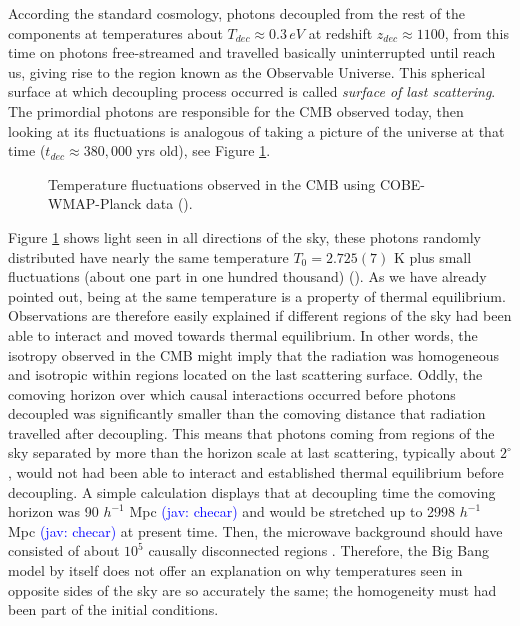\documentclass{rmaa}
\newcommand{\jav}[1]{\textcolor{blue}{(jav: #1)}}
\begin{document}
According the standard cosmology, photons decoupled from the rest of the 
components at temperatures about $T_{dec}\approx 0.3\, eV$ at redshift
$z_{dec} \approx 1100$, from this time on photons free-streamed and travelled basically
 uninterrupted until reach us, giving rise to the region known as the Observable Universe.
 This spherical surface at which decoupling process occurred is called 
\textit{surface of last scattering}.
The primordial photons are responsible for the CMB observed today, then looking at its
fluctuations is analogous of taking a picture of the universe at that time 
($t_{dec}\approx 380,000$ yrs old), see Figure \ref{fig:wmap5}.
\\

\begin{figure}[ht] 
\centerline{ \epsfxsize=210pt  }
\caption{Temperature fluctuations observed in the CMB using 
 COBE-WMAP-Planck data (\citep{Gold}\citep{Planckxi}\citep{Planckxvi}).}
\label{fig:wmap5}
\end{figure}

Figure \ref{fig:wmap5} shows light seen in all directions of the sky, 
these photons randomly distributed have nearly the same temperature $T_0= 2.725(7)$ K
plus small fluctuations (about one part in one hundred thousand) (\cite{Apar,Planckck}).
 As we have already pointed out, being at the same 
temperature is a property of thermal equilibrium. Observations are therefore easily explained 
if different regions of the sky had been able to interact and moved towards thermal 
equilibrium. In other words, the isotropy observed in the CMB might imply that the radiation was 
homogeneous and isotropic within regions located on the last scattering surface.
Oddly, the comoving horizon over which causal interactions occurred before  
photons decoupled was significantly smaller than the comoving distance 
that radiation travelled after decoupling.
This means that photons coming from regions of the sky separated by more than the
horizon scale at last scattering, typically about $2^\circ$, would not 
had been  able to interact and established thermal equilibrium before decoupling. 
A simple calculation displays that at decoupling time the comoving horizon was
90 $h^{-1}$ Mpc \jav{checar} and would be stretched up to 2998 $h^{-1}$ Mpc \jav{checar} at present time.
Then, the microwave background should have consisted of about $10^5$ causally 
disconnected regions \citep{McCoy}.  
Therefore, the Big Bang model by itself does not offer an explanation on why
temperatures seen in opposite sides of the sky are so accurately the same; the homogeneity
must had been part of the initial conditions. 
\\
\end{document}
